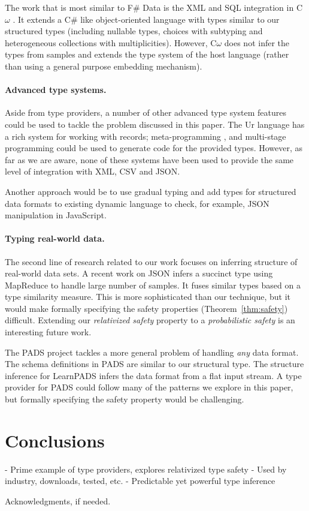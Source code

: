 \documentclass[preprint]{sigplanconf}
\begin{document}
The work that is most similar to F\# Data is the XML and SQL integration in C$\omega$ \cite{comega-xs}.
It extends a C\# like object-oriented language with types similar to our structured types 
(including nullable types, choices with subtyping and heterogeneous collections with multiplicities).
However, C$\omega$ does not infer the types from samples and extends the type system of the host
language (rather than using a general purpose embedding mechanism).

\paragraph{Advanced type systems.}
Aside from type providers, a number of other advanced type system features could be used to
tackle the problem discussed in this paper. The Ur \cite{ur} language has a rich system for working
with records; meta-programming \cite{template-hask}, \cite{th-camlp4} and multi-stage programming \cite{multi-stage}
could be used to generate code for the provided types. However, as far as we are aware, none of these 
systems have been used to provide the same level of integration with XML, CSV and JSON.

Another approach would be to use gradual typing \cite{gradual,gradual-js} and add types for structured
data formats to existing dynamic language to check, for example, JSON manipulation in JavaScript.

\paragraph{Typing real-world data.}
The second line of research related to our work focuses on inferring structure of real-world data sets.
A recent work on JSON \cite{typing-json} infers a succinct type using MapReduce to handle large number
of samples. It fuses similar types based on a type similarity measure. This is more sophisticated than
our technique, but it would make formally specifying the safety properties (Theorem~\ref{thm:safety}) difficult.
Extending our \emph{relativized safety} property to a \emph{probabilistic safety} is an interesting 
future work.

The PADS project \cite{pads-dsl,pads-ml} tackles a more general problem of handling \emph{any} data format.
The schema definitions in PADS are similar to our structural type. The structure inference for LearnPADS
\cite{pads-learn} infers the data format from a flat input stream. A type provider for PADS could follow
many of the patterns we explore in this paper, but formally specifying the safety property would be
challenging.

\section{Conclusions}
\label{sec:conclusions}

  - Prime example of type providers, explores relativized type safety
  - Used by industry, downloads, tested, etc. 
  - Predictable yet powerful type inference

\acks
Acknowledgments, if needed.


\cite{age-of-web}



\end{document}
